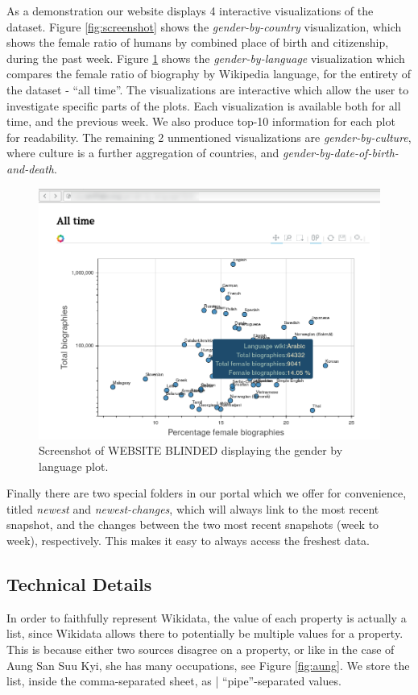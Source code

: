 \documentclass[letterpaper]{article}
\begin{document}
As a demonstration our website displays 4 interactive visualizations of the dataset. Figure \ref{fig:screenshot} shows the \textit{gender-by-country} visualization, which shows the female ratio of humans by combined place of birth and citizenship, during the past week. Figure \ref{fig:screenshot2} shows the \textit{gender-by-language} visualization which compares the female ratio of biography by Wikipedia language, for the entirety of the dataset - ``all time''. The visualizations are interactive which allow the user to investigate specific parts of the plots. Each visualization is available both for all time, and the previous week. We also produce top-10 information for each plot for readability. The remaining 2 unmentioned visualizations are \textit{gender-by-culture}, where culture is a further aggregation of countries, and \textit{gender-by-date-of-birth-and-death}.

\begin{figure}
\includegraphics[scale=0.25]{figures/screenshot2.png} 
\caption{Screenshot of WEBSITE BLINDED displaying the gender by language plot.}
\label{fig:screenshot2}
\end{figure}

Finally there are two special folders in our portal which we offer for convenience,  titled \textit{newest} and \textit{newest-changes}, which will always link to the most recent snapshot, and the changes between the two most recent snapshots (week to week), respectively. This makes it easy to always access the freshest data.

\subsection{Technical Details}
In order to faithfully represent Wikidata, the value of each property is actually a list, since Wikidata allows there to potentially be multiple values for a property. This is because either two sources disagree on a property, or like in the case of Aung San Suu Kyi, she has many occupations, see Figure \ref{fig:aung}. We store the list, inside the comma-separated sheet, as | ``pipe''-separated values.
\end{document}
